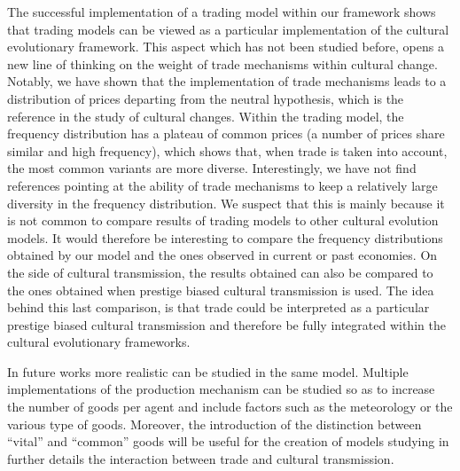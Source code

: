 \documentclass{wscpaperproc}
\begin{document}
The successful implementation of a trading model within our framework shows that trading models can be viewed as a particular implementation of the cultural evolutionary framework. This aspect which has not been studied before, opens a new line of thinking on the weight of trade mechanisms within cultural change. Notably, we have shown that the implementation of trade mechanisms leads to a distribution of prices departing from the neutral hypothesis, which is the reference in the study of cultural changes. Within the trading model, the frequency distribution has a plateau of common prices (a number of prices share similar and high frequency), which shows that, when trade is taken into account, the most common variants are more diverse. Interestingly, we have not find references pointing at the ability of trade mechanisms to keep a relatively large diversity in the frequency distribution. We suspect that this is mainly because it is not common to compare results of trading models to other cultural evolution models. It would therefore be interesting to compare the frequency distributions obtained by our model and the ones observed in current or past economies. On the side of cultural transmission, the results obtained can also be compared to the ones obtained when prestige biased cultural transmission is used. The idea behind this last comparison, is that trade could be interpreted as a particular prestige biased cultural transmission and therefore be fully integrated within the cultural evolutionary frameworks.


In future works more realistic can be studied in the same model. Multiple implementations of the production mechanism can be studied so as to increase the number of goods per agent and include factors such as the meteorology or the various type of goods. Moreover, the introduction of the distinction between ``vital'' and ``common'' goods will be useful for the creation of models studying in further details the interaction between trade and cultural transmission. 
\end{document}
